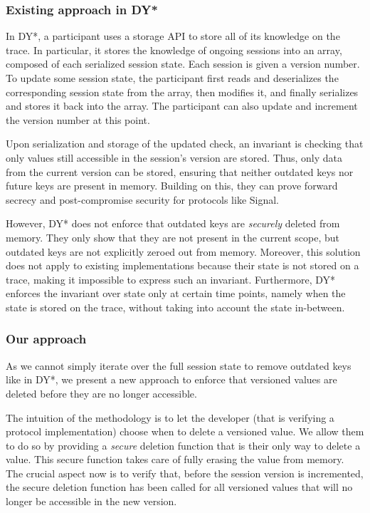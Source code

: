 \subsubsection{Existing approach in DY*}
\label{sec:existing-approach-in-dy}

In DY*, a participant uses a storage API to store all of its knowledge on the trace.
In particular, it stores the knowledge of ongoing sessions into an array, composed of each serialized session state.
Each session is given a version number.
To update some session state, the participant first reads and deserializes the corresponding session state from the array, then modifies it, and finally serializes and stores it back into the array.
The participant can also update and increment the version number at this point.

Upon serialization and storage of the updated check, an invariant is checking that only values still accessible in the session's version are stored.
Thus, only data from the current version can be stored, ensuring that neither outdated keys nor future keys are present in memory.
Building on this, they can prove forward secrecy and post-compromise security for protocols like Signal.

However, DY* does not enforce that outdated keys are \emph{securely} deleted from memory. They only show that they are not present in the current scope, but outdated keys are not explicitly zeroed out from memory.
Moreover, this solution does not apply to existing implementations because their state is not stored on a trace, making it impossible to express such an invariant.
Furthermore, DY* enforces the invariant over state only at certain time points, namely when the state is stored on the trace, without taking into account the state in-between.

\subsubsection{Our approach}
\label{sec:our-approach}

As we cannot simply iterate over the full session state to remove outdated keys like in DY*, we present a new approach to enforce that versioned values are deleted before they are no longer accessible.

The intuition of the methodology is to let the developer (that is verifying a protocol implementation) choose when to delete a versioned value.
We allow them to do so by providing a \emph{secure} deletion function that is their only way to delete a value. This secure function takes care of fully erasing the value from memory.
The crucial aspect now is to verify that, before the session version is incremented, the secure deletion function has been called for all versioned values that will no longer be accessible in the new version.

